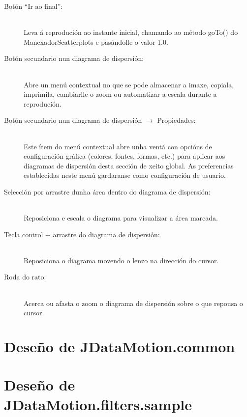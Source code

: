 \begin{description}
\begin{description}
\item[Botón ``Ir ao final'':] \hfill \\
Leva á reprodución ao instante inicial, chamando ao método goTo() do ManexadorScatterplots e pasándolle o valor 1.0.

\item[Botón secundario nun diagrama de dispersión:] \hfill \\
Abre un menú contextual no que se pode almacenar a imaxe, copiala, imprimila, cambiarlle o zoom ou automatizar a escala durante a reprodución.

\item[Botón secundario nun diagrama de dispersión $\rightarrow$ Propiedades:] \hfill \\
Este ítem do menú contextual abre unha ventá con opcións de configuración gráfica (colores, fontes, formas, etc.) para aplicar aos diagramas de dispersión desta sección de xeito global. As preferencias establecidas neste menú gardaranse como configuración de usuario.

\item[Selección por arrastre dunha área dentro do diagrama de dispersión:] \hfill \\
Reposiciona e escala o diagrama para visualizar a área marcada.

\item[Tecla control + arrastre do diagrama de dispersión:] \hfill \\
Reposiciona o diagrama movendo o lenzo na dirección do cursor.

\item[Roda do rato:] \hfill \\
Acerca ou afasta o zoom o diagrama de dispersión sobre o que repousa o cursor.

\end{description}

\end{description}

\section{Deseño de JDataMotion.common}

\section{Deseño de JDataMotion.filters.sample}